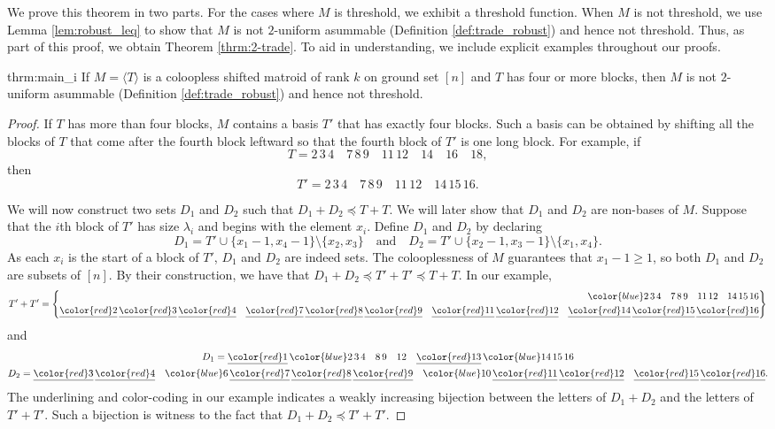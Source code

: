 \documentclass{amsart}
\theoremstyle{definition}
\theoremstyle{plain}
\begin{document}
We prove this theorem in two parts. For the cases where $M$ is threshold, we exhibit a threshold function. When $M$ is not threshold, we use Lemma \ref{lem:robust_leq} to show that $M$ is not $2$-uniform asummable (Definition \ref{def:trade_robust}) and hence not threshold. Thus, as part of this proof, we obtain Theorem \ref{thrm:2-trade}. To aid in understanding, we include explicit examples throughout our proofs.
\begin{reptheorem}{thrm:main_i}
\label{prop:4blocks}
If $M=\langle T\rangle$ is a coloopless shifted matroid of rank $k$ on ground set $[n]$ and $T$ has four or more blocks, then $M$ is not $2$-uniform asummable (Definition \ref{def:trade_robust}) and hence not threshold. 
\end{reptheorem}
\begin{proof}
  If $T$ has more than four blocks, $M$ contains a basis $T'$ that has exactly four blocks. Such a basis can be obtained by shifting all the blocks of $T$ that come after the fourth block leftward so that the fourth block of $T'$ is one long block. For example, if \[T= 2\,3\,4\quad7\,8\,9\quad 11\,12 \quad 14\quad 16\quad 18,\] then \[T'=2\,3\,4\quad 7\,8\,9\quad 11\,12\quad 14\,15\,16.\]

  We will now construct two sets $D_1$ and $D_2$ such that $D_1+ D_2 \preceq T+T$. We will later show that $D_1$ and $D_2$ are non-bases of $M$. Suppose that the $i$th block of $T'$ has size $\lambda_i$ and begins with the element $x_i$. Define $D_1$ and $D_2$ by declaring
  \[D_1 = T'\cup \{x_1-1,x_4-1\} \setminus \{x_2,x_3\}\quad\text{and}\quad D_2= T'\cup \{x_2-1,x_3-1\} \setminus \{x_1,x_4\}.\]
  As each $x_i$ is the start of a block of $T'$, $D_1$ and $D_2$ are indeed sets. The colooplessness of $M$ guarantees that $x_1-1\geq 1$, so both $D_1$ and $D_2$ are subsets of $[n]$. By their construction, we have that $D_1+D_2 \preceq T'+T'\preceq T+T$. In our example,
\[
T'+T' = \left\{ \begin{aligned} {\color{blue}2\,3\,4\quad 7\,8\,9\quad 11\,12\quad  14\,15\,16}\\
\underline{\color{red}2}\,\underline{\color{red}3}\,\underline{\color{red}4}\quad \underline{\color{red}7}\,\underline{\color{red}8}\,\underline{\color{red}9}\quad \underline{\color{red}11}\,\underline{\color{red}12}\quad \underline{\color{red}14}\,\underline{\color{red}15}\,\underline{\color{red}16}
\end{aligned} \right\}
\]
and
\begin{gather*}
D_1 = \underline{\color{red}1}\,{\color{blue}2\,3\, 4\quad 8\,9\quad 12}\quad \underline{\color{red}13}\, {\color{blue}14\,15\,16}\\
D_2 = \underline{\color{red}3}\,\underline{\color{red}4}\quad {\color{blue}6}\, \underline{\color{red}7}\,\underline{\color{red}8}\,\underline{\color{red}9}\quad{\color{blue} 10}\,\underline{\color{red}11}\, \underline{\color{red}12}\quad \underline{\color{red}15}\,\underline{\color{red}16}.
\end{gather*}
The underlining and color-coding in our example indicates a weakly increasing bijection between the letters of $D_1+D_2$ and the letters of $T'+T'$. Such a bijection is witness to the fact that $D_1+D_2 \preceq T'+T'$.


\end{proof}
\end{document}
